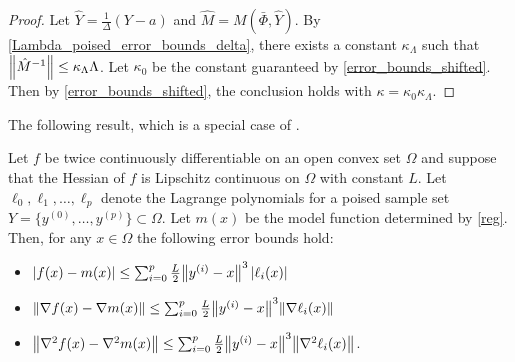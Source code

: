 \documentclass{article}
\begin{document}
\begin{proof}
Let $\hat{Y} = \frac{1}{\Delta}(Y-a)$ and $\hat{M} = M(\bar{\Phi},\hat{Y})$.    By \cref{Lambda_poised_error_bounds_delta}, there exists a constant $\kappa_{\Lambda}$ such that 
${\left\|\hat{M}^{-1}\right\|} \le \kappa_{\Lambda} \Lambda$.  Let $\kappa_0$ be the constant guaranteed by \cref{error_bounds_shifted}.  Then by \cref{error_bounds_shifted}, the conclusion holds with $\kappa = \kappa_0 \kappa_{\Lambda}$.
\end{proof}

The following result,  
which is a special case of \cite[Corollary 4.6]{billups.larson.ea:derivative-free}.
\begin{lemma}\label{lem:error_bound}
  Let $f$ be twice continuously differentiable on an open convex set $\Omega$ and suppose that the Hessian of $f$ is Lipschitz continuous on $\Omega$ with  constant $L$.     Let $\ell_0, \ell_1, \ldots, \ell_p$ denote the Lagrange polynomials for a poised sample set $Y=\{y^{(0)},\ldots,y^{(p)}\} \subset \Omega$.  Let $m(x)$ be the model function determined by \cref{reg}.  Then, for any $x \in \Omega$ the following error bounds hold:
  \begin{itemize}
    \item $|f(x)-m(x)| \le 
      \sum_{i=0}^p  \frac{L}{2} {\left\|y^{(i)}-x\right\|}^3 \left|\ell_i(x)\right| $
    \item ${\left\|\nabla f(x)-\nabla m(x)\right\|} 
      \le \sum_{i=0}^p \frac{L}{2} {\left\|y^{(i)}-x\right\|}^3 {\left\|\nabla \ell_i(x)\right\|}$ 
    \item ${\left\|\nabla^2 f(x)-\nabla^2 m(x)\right\|} 
      \le  \sum_{i=0}^p \frac{L}{2} {\left\|y^{(i)}-x\right\|}^3 {\left\|\nabla^2 \ell_i(x)\right\|} $.
  \end{itemize}
\end{lemma}
\end{document}
